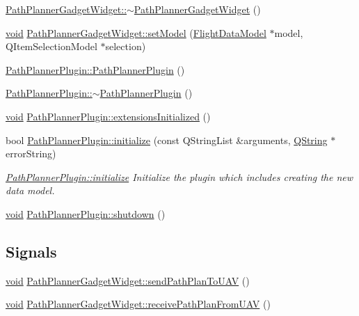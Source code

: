 \begin{DoxyCompactItemize}
\item 
\hyperlink{group___path_planner_gadget_plugin_ga7a9758a518eef6a55f9386ed8a552e29}{\-Path\-Planner\-Gadget\-Widget\-::$\sim$\-Path\-Planner\-Gadget\-Widget} ()
\item 
\hyperlink{group___u_a_v_objects_plugin_ga444cf2ff3f0ecbe028adce838d373f5c}{void} \hyperlink{group___path_planner_gadget_plugin_ga906747f7512d66ab544506fdd8ba5fc2}{\-Path\-Planner\-Gadget\-Widget\-::set\-Model} (\hyperlink{class_flight_data_model}{\-Flight\-Data\-Model} $\ast$model, \-Q\-Item\-Selection\-Model $\ast$selection)
\item 
\hyperlink{group___path_planner_gadget_plugin_ga754f3760ad2179865dabf983f1bcfb04}{\-Path\-Planner\-Plugin\-::\-Path\-Planner\-Plugin} ()
\item 
\hyperlink{group___path_planner_gadget_plugin_gabb5e520f0952f6c023ae86b5bb903197}{\-Path\-Planner\-Plugin\-::$\sim$\-Path\-Planner\-Plugin} ()
\item 
\hyperlink{group___u_a_v_objects_plugin_ga444cf2ff3f0ecbe028adce838d373f5c}{void} \hyperlink{group___path_planner_gadget_plugin_ga21fa3c1e21372d56ddf70b6fe5973897}{\-Path\-Planner\-Plugin\-::extensions\-Initialized} ()
\item 
bool \hyperlink{group___path_planner_gadget_plugin_ga08ada1f91b2f37c282cbabdcdb7af6d8}{\-Path\-Planner\-Plugin\-::initialize} (const \-Q\-String\-List \&arguments, \hyperlink{group___u_a_v_objects_plugin_gab9d252f49c333c94a72f97ce3105a32d}{\-Q\-String} $\ast$error\-String)
\begin{DoxyCompactList}\small\item\em \hyperlink{group___path_planner_gadget_plugin_ga08ada1f91b2f37c282cbabdcdb7af6d8}{\-Path\-Planner\-Plugin\-::initialize} \-Initialize the plugin which includes creating the new data model. \end{DoxyCompactList}\item 
\hyperlink{group___u_a_v_objects_plugin_ga444cf2ff3f0ecbe028adce838d373f5c}{void} \hyperlink{group___path_planner_gadget_plugin_ga86bbf998d72f805f00576608baf627ba}{\-Path\-Planner\-Plugin\-::shutdown} ()
\end{DoxyCompactItemize}
\subsection*{\-Signals}
\begin{DoxyCompactItemize}
\item 
\hyperlink{group___u_a_v_objects_plugin_ga444cf2ff3f0ecbe028adce838d373f5c}{void} \hyperlink{group___path_planner_gadget_plugin_ga65ade0264344b0cf65707fda3419f091}{\-Path\-Planner\-Gadget\-Widget\-::send\-Path\-Plan\-To\-U\-A\-V} ()
\item 
\hyperlink{group___u_a_v_objects_plugin_ga444cf2ff3f0ecbe028adce838d373f5c}{void} \hyperlink{group___path_planner_gadget_plugin_ga4da1c30707d66e4e343263500573eb39}{\-Path\-Planner\-Gadget\-Widget\-::receive\-Path\-Plan\-From\-U\-A\-V} ()
\end{DoxyCompactItemize}


